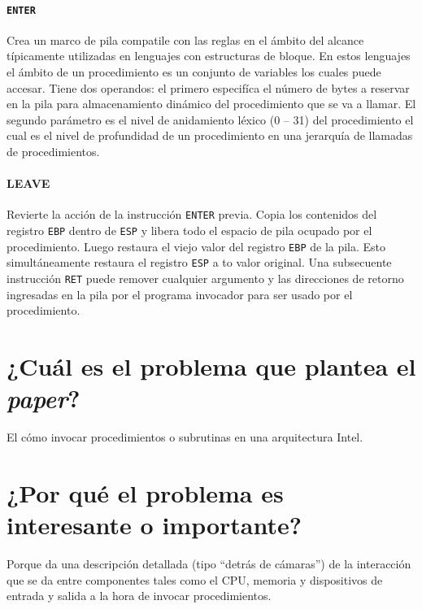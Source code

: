 \paragraph{\texttt{ENTER}}  
Crea un marco de pila compatile con las reglas en el ámbito del alcance típicamente utilizadas en lenguajes con estructuras de bloque. En estos lenguajes el ámbito de un procedimiento es un conjunto de variables los cuales puede accesar. Tiene dos operandos: el primero especifíca el número de bytes a reservar en la pila para almacenamiento dinámico del procedimiento que se va a llamar. El segundo parámetro es el nivel de anidamiento léxico (0 -- 31) del procedimiento el cual es el nivel de profundidad de un procedimiento en una jerarquía de llamadas de procedimientos.

\paragraph{LEAVE}
Revierte la acción de la instrucción \texttt{ENTER} previa. Copia los contenidos del registro \texttt{EBP} dentro de \texttt{ESP} y libera todo el espacio de pila ocupado por el procedimiento. Luego restaura el viejo valor del registro \texttt{EBP} de la pila. Esto simultáneamente restaura el registro \texttt{ESP} a to valor original. Una subsecuente instrucción \texttt{RET} puede remover cualquier argumento y las direcciones de retorno ingresadas en la pila por el programa invocador para ser usado por el procedimiento.


\section{¿Cuál es el problema que plantea el \textit{paper}?}
El cómo invocar procedimientos o subrutinas en una arquitectura Intel. 

\section{¿Por qué el problema es interesante o importante?}
Porque da una descripción detallada (tipo ``detrás de cámaras'') de la interacción que se da entre componentes tales como el CPU, memoria y dispositivos de entrada y salida a la hora de invocar procedimientos.   


